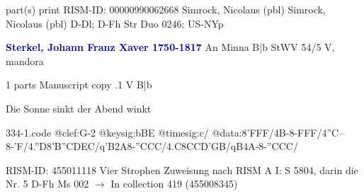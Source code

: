 \documentclass[twocolumn]{book}
\begin{document}
\newline \textcolor{darkblue}{}  part(s)  
\newline print
\newline RISM-ID: 00000990062668
\newline Simrock, Nicolaus  (pbl)
\newline Simrock, Nicolaus  (pbl)
\newline D-Dl; D-Fh  Str Duo 0246; US-NYp
\newline \par \vspace{7pt} \textcolor{darkblue}{\textbf{Sterkel, Johann Franz Xaver  1750-1817}}
\newline An Minna  B|b  StWV 54/5
\newline V, mandora
\newline \begin{itshape}\end{itshape} 
\newline \textcolor{darkblue}{}  1 parts  
\newline Manuscript copy
.1  V  B|b
\newline \begin{footnotesize} Die Sonne sinkt der Abend winkt \end{footnotesize}  
\begin{filecontents*}{334-1.code}
@clef:G-2
@keysig:bBE
@timesig:c/
@data:8'FFF/4B-8-FFF/4''C--8-'F/4.''D8'B{''CD}{EC}/q'B2A8-''CCC/4.C8C{CD}{'GB}/qB4A-8-''CCC/
\end{filecontents*}
\newline
%

\newline RISM-ID: 455011118
\newline Vier Strophen
\newline Zuweisung nach RISM A I: S 5804, darin die Nr. 5
\newline D-Fh  Ms 002
\newline $\rightarrow$ In collection 419 (455008345)
\end{document}
